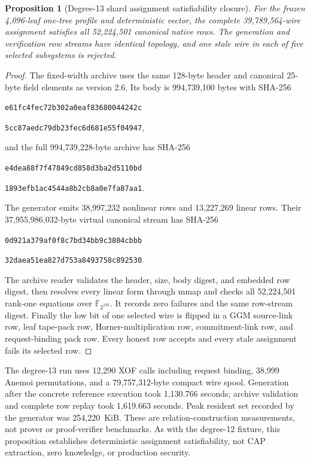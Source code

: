 \documentclass[11pt]{article}
\newtheorem{proposition}[definition]{Proposition}
\begin{document}
\begin{proposition}[Degree-13 shard assignment satisfiability closure]
For the frozen 4,096-leaf one-tree profile and deterministic vector, the
complete 39,789,564-wire assignment satisfies all 52,224,501 canonical native
rows.  The generation and verification row streams have identical topology,
and one stale wire in each of five selected subsystems is rejected.
\end{proposition}
\begin{proof}
The fixed-width archive uses the same 128-byte header and canonical 25-byte
field elements as version 2.6.  Its body is 994,739,100 bytes with SHA-256
\begin{center}
\texttt{e61fc4fec72b302a0eaf83680044242c}\par\vspace{-0.2em}
\texttt{5cc87aedc79db23fec6d681e55f04947},
\end{center}
and the full 994,739,228-byte archive has SHA-256
\begin{center}
\texttt{e4dea88f7f47849cd858d3ba2d5110bd}\par\vspace{-0.2em}
\texttt{1893efb1ac4544a8b2cb8a0e7fa87aa1}.
\end{center}
The generator emits 38,997,232 nonlinear rows and 13,227,269 linear rows.
Their 37,955,986,032-byte virtual canonical stream has SHA-256
\begin{center}
\texttt{0d921a379af0f8c7bd34bb9c3804cbbb}\par\vspace{-0.2em}
\texttt{32daea51ea827d753a8493758c892530}.
\end{center}
The archive reader validates the header, size, body digest, and embedded row
digest, then resolves every linear form through mmap and checks all 52,224,501
rank-one equations over $\mathbb F_{2^{193}}$.  It records zero failures and
the same row-stream digest.  Finally the low bit of one selected wire is
flipped in a GGM source-link row, leaf tape-pack row, Horner-multiplication
row, commitment-link row, and request-binding pack row.  Every honest row
accepts and every stale assignment fails its selected row.
\end{proof}

The degree-13 run uses 12,290 XOF calls including request binding, 38,999
Anemoi permutations, and a 79,757,312-byte compact wire spool.  Generation
after the concrete reference execution took 1,130.766 seconds; archive
validation and complete row replay took 1,619.663 seconds.  Peak resident set
recorded by the generator was 254,220~KiB.  These are relation-construction
measurements, not prover or proof-verifier benchmarks.  As with the degree-12
fixture, this proposition establishes deterministic assignment
satisfiability, not CAP extraction, zero knowledge, or production security.
\end{document}
